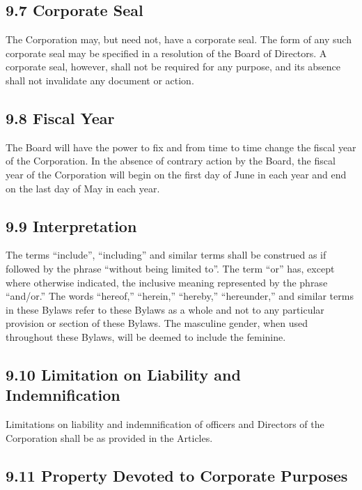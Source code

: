 \documentclass[
]{book}
\begin{document}
\subsection{9.7 Corporate Seal}\label{corporate-seal}

The Corporation may, but need not, have a corporate seal. The form of any such corporate seal may be specified in a resolution of the Board of Directors. A corporate seal, however, shall not be required for any purpose, and its absence shall not invalidate any document or action.

\subsection{9.8 Fiscal Year}\label{fiscal-year}

The Board will have the power to fix and from time to time change the fiscal year of the Corporation. In the absence of contrary action by the Board, the fiscal year of the Corporation will begin on the first day of June in each year and end on the last day of May in each year.

\subsection{9.9 Interpretation}\label{interpretation}

The terms ``include'', ``including'' and similar terms shall be construed as if followed by the phrase ``without being limited to''. The term ``or'' has, except where otherwise indicated, the inclusive meaning represented by the phrase ``and/or.'' The words ``hereof,'' ``herein,'' ``hereby,'' ``hereunder,'' and similar terms in these Bylaws refer to these Bylaws as a whole and not to any particular provision or section of these Bylaws. The masculine gender, when used throughout these Bylaws, will be deemed to include the feminine.

\subsection{9.10 Limitation on Liability and Indemnification}\label{limitation-on-liability-and-indemnification}

Limitations on liability and indemnification of officers and Directors of the Corporation shall be as provided in the Articles.

\subsection{9.11 Property Devoted to Corporate Purposes}\label{property-devoted-to-corporate-purposes}
\end{document}
